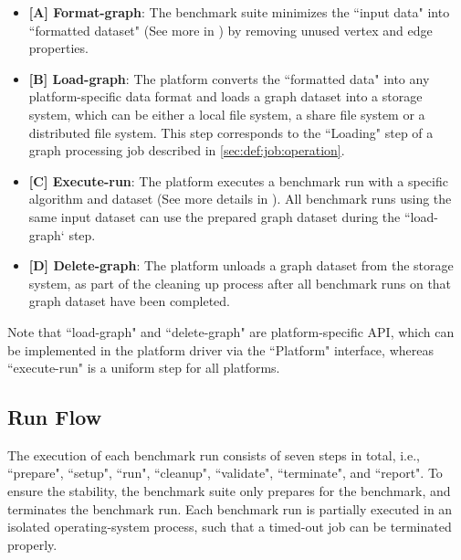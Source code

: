\begin{itemize}
    \item \textbf{[A] Format-graph}: The benchmark suite minimizes the ``input data" into ``formatted dataset" (See more in ) by removing unused vertex and edge properties.
    
    \item \textbf{[B] Load-graph}: The platform converts the ``formatted data" into any platform-specific data format and loads a graph dataset into a storage system, which can be either a local file system, a share file system or a distributed file system. This step corresponds to the ``Loading" step of a graph processing job described in \ref{sec:def:job:operation}.
    
    \item \textbf{[C] Execute-run}: The platform executes a benchmark run with a specific algorithm and dataset (See more details in ). All benchmark runs using the same input dataset can use the prepared graph dataset during the ``load-graph` step. 
    
    \item \textbf{[D] Delete-graph}: The platform unloads a graph dataset from the storage system, as part of the cleaning up process after all benchmark runs on that graph dataset have been completed.
\end{itemize}

Note that ``load-graph" and ``delete-graph" are platform-specific API, which can be implemented in the platform driver via the ``Platform" interface, whereas  ``execute-run" is a uniform step for all platforms.

\subsection{Run Flow}
\label{sec:process:execution:run_flow}
The execution of each benchmark run consists of seven steps in total, i.e., ``prepare", ``setup", ``run", ``cleanup", ``validate", ``terminate", and  ``report". To ensure the stability, the benchmark suite only prepares for the benchmark, and terminates the benchmark run. Each benchmark run is partially executed in an isolated operating-system process, such that a timed-out job can be terminated properly.

